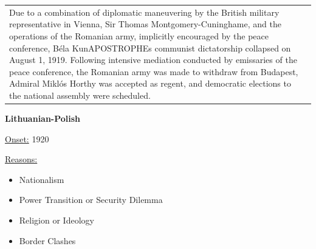{\begin{longtable}{p{}p{}}
Due to a combination of diplomatic maneuvering by the British military representative in Vienna, Sir Thomas Montgomery-Cuninghame, and the operations of the Romanian army, implicitly encouraged by the peace conference, Béla KunAPOSTROPHEs communist dictatorship collapsed on August 1, 1919. Following intensive mediation conducted by emissaries of the peace conference, the Romanian army was made to withdraw from Budapest, Admiral Miklós Horthy was accepted as regent, and democratic elections to the national assembly were scheduled.
\\
\end{longtable}}
\clearpage
         \textbf{Lithuanian-Polish} 

          \underline{Onset:} 1920         

\underline{Reasons:}
\begin{itemize}
\item Nationalism
\item Power Transition or Security Dilemma
\item Religion or Ideology
\item Border Clashes
\end{itemize}

